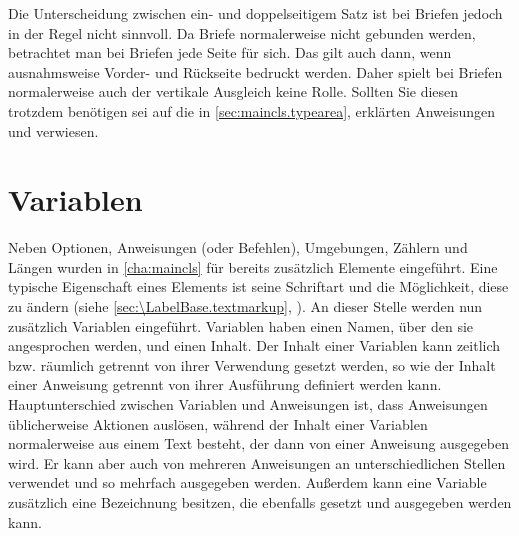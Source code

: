 


Die Unterscheidung zwischen ein- und doppelseitigem Satz ist bei Briefen
jedoch in der Regel nicht sinnvoll. Da Briefe normalerweise nicht gebunden
werden, betrachtet man bei Briefen jede Seite für sich. Das gilt auch dann,
wenn ausnahmsweise Vorder- und Rückseite bedruckt werden. Daher spielt bei
Briefen normalerweise auch der vertikale Ausgleich keine Rolle. Sollten Sie
diesen trotzdem benötigen
\iffalse%
oder wissen wollen, was das ist, %
\fi%
sei auf die in \autoref{sec:maincls.typearea},
 erklärten Anweisungen
 und
 verwiesen.%
%
\EndIndexGroup


\section{Variablen}
%
\BeginIndexGroup
{}%

Neben Optionen, Anweisungen (oder Befehlen), Umgebungen, Zählern und Längen
wurden in \autoref{cha:maincls} für \KOMAScript{} bereits zusätzlich Elemente
eingeführt.  Eine typische Eigenschaft eines Elements ist seine Schriftart und
die Möglichkeit, diese zu ändern (siehe \autoref{sec:\LabelBase.textmarkup},
).  An dieser Stelle werden nun
zusätzlich Variablen eingeführt. Variablen haben einen
Namen, über den sie angesprochen werden,
und einen Inhalt. Der Inhalt einer
Variablen kann zeitlich bzw. räumlich getrennt von ihrer Verwendung gesetzt
werden, so wie der Inhalt einer Anweisung getrennt von ihrer Ausführung
definiert werden kann. Hauptunterschied zwischen Variablen und Anweisungen
ist, dass Anweisungen üblicherweise Aktionen auslösen, während der Inhalt
einer Variablen normalerweise aus einem Text besteht, der dann von einer
Anweisung ausgegeben wird. Er kann aber auch von mehreren Anweisungen an
unterschiedlichen Stellen verwendet und so mehrfach ausgegeben
werden. Außerdem kann eine Variable zusätzlich eine
Bezeichnung besitzen, die
ebenfalls gesetzt und ausgegeben werden kann.

